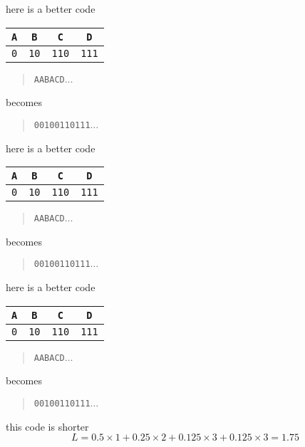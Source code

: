 \documentclass{beamer}
\newcommand{\crish}{\color{reddish}}
\newcommand{\cbla}{\color{black}}
\newcommand{\cred}{\color{red}}
\newcommand{\cblu}{\color{blue}}
\newcommand{\cgre}{\color{green}}
\newcommand{\letter}[1]{\color{blue}\texttt{#1}\color{black}}
\newcommand{\binary}[1]{\color{red}\texttt{#1}\color{black}}
\begin{document}
\begin{frame}{here is a better code}
\begin{center}
\begin{tabular}{cccc}
\letter{A}&\letter{B}&\letter{C}&\letter{D}\\
\hline
\binary{0}&\binary{10}&\binary{110}&\binary{111}
\end{tabular}
\end{center}
  \begin{quote}
    \letter{AAB\cgre A\cblu{}CD}$\ldots$
  \end{quote}
  becomes
    \begin{quote}
    \binary{0010\cgre 0\cred{}110111}$\ldots$
    \end{quote}
\end{frame}  


\begin{frame}{here is a better code}
\begin{center}
\begin{tabular}{cccc}
\letter{A}&\letter{B}&\letter{C}&\letter{D}\\
\hline
\binary{0}&\binary{10}&\binary{110}&\binary{111}
\end{tabular}
\end{center}
  \begin{quote}
    \letter{AABA\cgre C\cblu{}D}$\ldots$
  \end{quote}
  becomes
    \begin{quote}
    \binary{00100\cgre 110\cred{}111}$\ldots$
    \end{quote}
\end{frame}  


\begin{frame}{here is a better code}
\begin{center}
\begin{tabular}{cccc}
\letter{A}&\letter{B}&\letter{C}&\letter{D}\\
\hline
\binary{0}&\binary{10}&\binary{110}&\binary{111}
\end{tabular}
\end{center}
  \begin{quote}
    \letter{AABAC\cgre D\cblu{}}$\ldots$
  \end{quote}
  becomes
    \begin{quote}
    \binary{00100110\cgre 111\cred{}}$\ldots$
    \end{quote}
\end{frame}  

\begin{frame}{this code is shorter}
  \crish
  $$
  L=0.5\times 1 +0.25\times 2 + 0.125\times 3 +
0.125\times 3=1.75
$$
\cbla
\end{frame}
\end{document}
